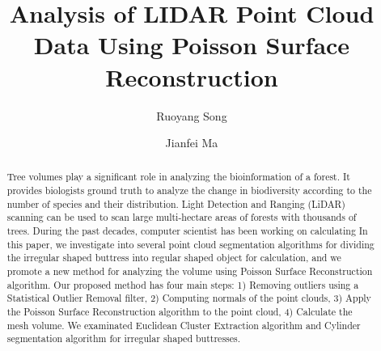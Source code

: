 \documentclass[runningheads,a4paper]{llncs}
\begin{document}

\title{Analysis of LIDAR Point Cloud Data Using Poisson Surface Reconstruction}


%
%
\author{Ruoyang Song\and Jianfei Ma}



%
%

\maketitle


\begin{abstract}
Tree volumes play a significant role in analyzing the bioinformation of a forest. It provides biologists ground truth to analyze the change in biodiversity according to the number of species and their distribution. Light Detection and Ranging (LiDAR) scanning can be used to scan large multi-hectare areas of forests with thousands of trees. During the past decades, computer scientist has been working on calculating In this paper, we investigate into several point cloud segmentation algorithms for dividing the irregular shaped buttress into regular shaped object for calculation, and we promote a new method for analyzing the volume using Poisson Surface Reconstruction algorithm.  Our proposed method has four main steps: 1) Removing outliers using a Statistical Outlier Removal filter, 2) Computing normals of the point clouds, 3) Apply the Poisson Surface Reconstruction algorithm to the point cloud, 4) Calculate the mesh volume. We examinated Euclidean Cluster Extraction algorithm and Cylinder segmentation algorithm for irregular shaped buttresses.
\end{abstract}
\end{document}
